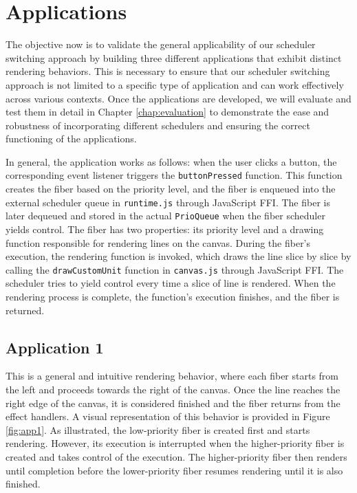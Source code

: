 \documentclass[logo,bsc,singlespacing,parskip]{infthesis}
\begin{document}
\section{Applications}

The objective now is to validate the general applicability of our scheduler switching approach by building three different applications that exhibit distinct rendering behaviors. This is necessary to ensure that our scheduler switching approach is not limited to a specific type of application and can work effectively across various contexts. Once the applications are developed, we will evaluate and test them in detail in Chapter \ref{chap:evaluation} to demonstrate the ease and robustness of incorporating different schedulers and ensuring the correct functioning of the applications.

In general, the application works as follows: when the user clicks a button, the corresponding event listener triggers the \texttt{buttonPressed} function. This function creates the fiber based on the priority level, and the fiber is enqueued into the external scheduler queue in \texttt{runtime.js} through JavaScript FFI. The fiber is later dequeued and stored in the actual \texttt{PrioQueue} when the fiber scheduler yields control. The fiber has two properties: its priority level and a drawing function responsible for rendering lines on the canvas. During the fiber's execution, the rendering function is invoked, which draws the line slice by slice by calling the \texttt{drawCustomUnit} function in \texttt{canvas.js} through JavaScript FFI. The scheduler tries to yield control every time a slice of line is rendered. When the rendering process is complete, the function's execution finishes, and the fiber is returned.

\subsection{Application 1}
This is a general and intuitive rendering behavior, where each fiber starts from the left and proceeds towards the right of the canvas. Once the line reaches the right edge of the canvas, it is considered finished and the fiber returns from the effect handlers. A visual representation of this behavior is provided in Figure \ref{fig:app1}. As illustrated, the low-priority fiber is created first and starts rendering. However, its execution is interrupted when the higher-priority fiber is created and takes control of the execution. The higher-priority fiber then renders until completion before the lower-priority fiber resumes rendering until it is also finished.
\end{document}
